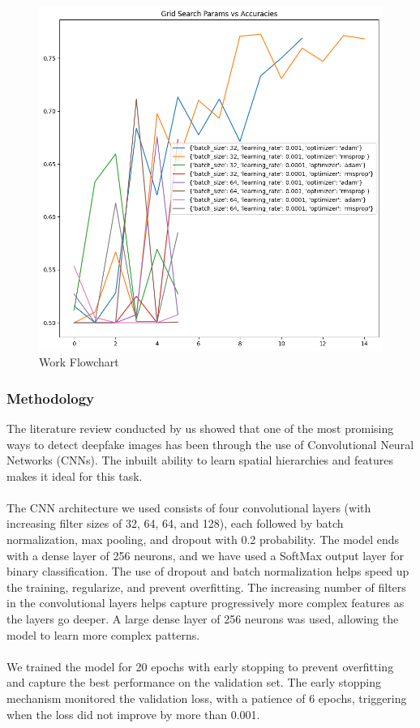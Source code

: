 \documentclass[10pt,twocolumn,letterpaper]{article}
\begin{document}
\begin{figure}[H]
    \centering
    \includegraphics[scale=0.3]{7.png}
    \caption{Work Flowchart}
\end{figure}

\subsubsection{Methodology}
The literature review conducted by us showed that one of the most promising ways to detect deepfake images has been through the use of Convolutional Neural Networks (CNNs). The inbuilt ability to learn spatial hierarchies and features makes it ideal for this task. 
\\\\
The CNN architecture we used consists of four convolutional layers (with increasing filter sizes of 32, 64, 64, and 128), each followed by batch normalization, max pooling, and dropout with 0.2 probability. The model ends with a dense layer of 256 neurons, and we have used a SoftMax output layer for binary classification. The use of dropout and batch normalization helps speed up the training, regularize, and prevent overfitting. The increasing number of filters in the convolutional layers helps capture progressively more complex features as the layers go deeper. A large dense layer of 256 neurons was used, allowing the model to learn more complex patterns.
\\\\
We trained the model for 20 epochs with early stopping to prevent overfitting and capture the best performance on the validation set. The early stopping mechanism monitored the validation loss, with a patience of 6 epochs, triggering when the loss did not improve by more than 0.001.
\end{document}
